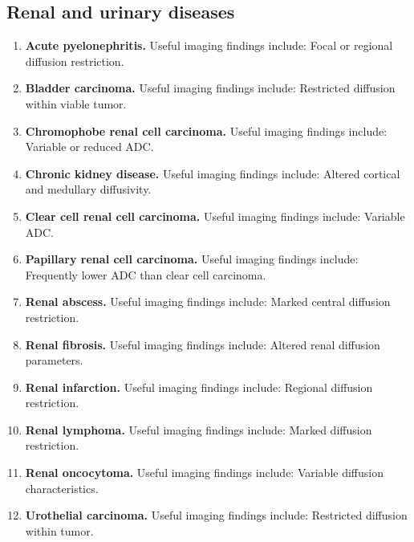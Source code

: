 \subsection{Renal and urinary diseases}
\begin{enumerate}[leftmargin=*,itemsep=0.45em,topsep=0.4em]
\item \textbf{Acute pyelonephritis.} Useful imaging findings include: Focal or regional diffusion restriction.
\item \textbf{Bladder carcinoma.} Useful imaging findings include: Restricted diffusion within viable tumor.
\item \textbf{Chromophobe renal cell carcinoma.} Useful imaging findings include: Variable or reduced ADC.
\item \textbf{Chronic kidney disease.} Useful imaging findings include: Altered cortical and medullary diffusivity.
\item \textbf{Clear cell renal cell carcinoma.} Useful imaging findings include: Variable ADC.
\item \textbf{Papillary renal cell carcinoma.} Useful imaging findings include: Frequently lower ADC than clear cell carcinoma.
\item \textbf{Renal abscess.} Useful imaging findings include: Marked central diffusion restriction.
\item \textbf{Renal fibrosis.} Useful imaging findings include: Altered renal diffusion parameters.
\item \textbf{Renal infarction.} Useful imaging findings include: Regional diffusion restriction.
\item \textbf{Renal lymphoma.} Useful imaging findings include: Marked diffusion restriction.
\item \textbf{Renal oncocytoma.} Useful imaging findings include: Variable diffusion characteristics.
\item \textbf{Urothelial carcinoma.} Useful imaging findings include: Restricted diffusion within tumor.
\end{enumerate}

